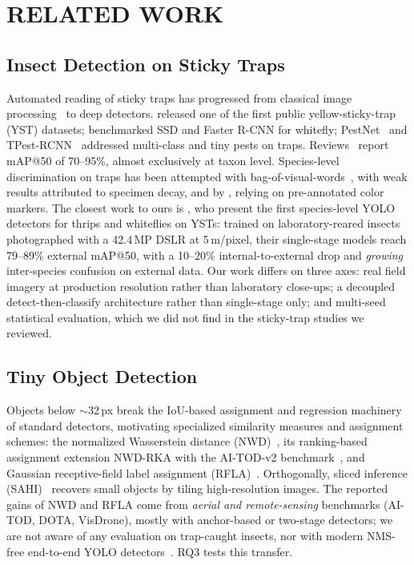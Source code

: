 \section{\uppercase{Related Work}}
\label{sec:related}

\subsection{Insect Detection on Sticky Traps}

Automated reading of sticky traps has progressed from classical image processing~\cite{sun2017,espinoza2016} to deep detectors. \cite{nieuwenhuizen2018} released one of the first public yellow-sticky-trap (YST) datasets; \cite{gutierrez2019} benchmarked SSD and Faster R-CNN for whitefly; PestNet~\cite{liu2019pestnet} and TPest-RCNN~\cite{li2021tpest} addressed multi-class and tiny pests on traps. Reviews~\cite{teixeira2023,preti2021} report mAP@50 of 70--95\%, almost exclusively at taxon level. Species-level discrimination on traps has been attempted with bag-of-visual-words~\cite{bockmann2021}, with weak results attributed to specimen decay, and by \cite{niyigena2023}, relying on pre-annotated color markers. The closest work to ours is \cite{laekeman2025}, who present the first species-level YOLO detectors for thrips and whiteflies on YSTs: trained on laboratory-reared insects photographed with a 42.4\,MP DSLR at 5\,\textmu m/pixel, their single-stage models reach 79--89\% external mAP@50, with a 10--20\% internal-to-external drop and \emph{growing} inter-species confusion on external data. Our work differs on three axes: real field imagery at production resolution rather than laboratory close-ups; a decoupled detect-then-classify architecture rather than single-stage only; and multi-seed statistical evaluation, which we did not find in the sticky-trap studies we reviewed.

\subsection{Tiny Object Detection}

Objects below $\sim$32\,px break the IoU-based assignment and regression machinery of standard detectors, motivating specialized similarity measures and assignment schemes: the normalized Wasserstein distance (NWD)~\cite{wang2021nwd}, its ranking-based assignment extension NWD-RKA with the AI-TOD-v2 benchmark~\cite{xu2022aitod}, and Gaussian receptive-field label assignment (RFLA)~\cite{xu2022rfla}. Orthogonally, sliced inference (SAHI)~\cite{akyon2022sahi,keles2022} recovers small objects by tiling high-resolution images. The reported gains of NWD and RFLA come from \emph{aerial and remote-sensing} benchmarks (AI-TOD, DOTA, VisDrone), mostly with anchor-based or two-stage detectors; we are not aware of any evaluation on trap-caught insects, nor with modern NMS-free end-to-end YOLO detectors~\cite{yolo26}. RQ3 tests this transfer.

